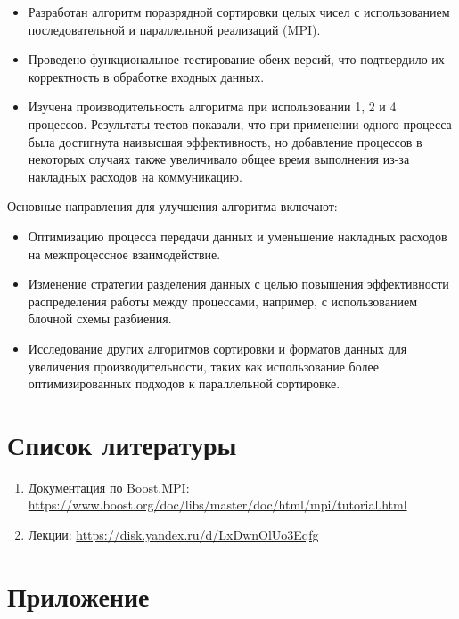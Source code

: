 \documentclass[12pt]{article}
\begin{document}
\begin{itemize}
    \item Разработан алгоритм поразрядной сортировки целых чисел с использованием последовательной и параллельной реализаций (MPI).
    
    \item Проведено функциональное тестирование обеих версий, что подтвердило их корректность в обработке входных данных.
    
    \item Изучена производительность алгоритма при использовании 1, 2 и 4 процессов. Результаты тестов показали, что при применении одного процесса была достигнута наивысшая эффективность, но добавление процессов в некоторых случаях также увеличивало общее время выполнения из-за накладных расходов на коммуникацию.
\end{itemize}

Основные направления для улучшения алгоритма включают:

\begin{itemize}
    \item Оптимизацию процесса передачи данных и уменьшение накладных расходов на межпроцессное взаимодействие.
    
    \item Изменение стратегии разделения данных с целью повышения эффективности распределения работы между процессами, например, с использованием блочной схемы разбиения.
    
    \item Исследование других алгоритмов сортировки и форматов данных для увеличения производительности, таких как использование более оптимизированных подходов к параллельной сортировке.
\end{itemize}


\section{Список литературы}
\begin{enumerate}
    \item Документация по Boost.MPI: \url{https://www.boost.org/doc/libs/master/doc/html/mpi/tutorial.html}
    \item Лекции: \url{https://disk.yandex.ru/d/LxDwnOlUo3Eqfg}
\end{enumerate}
\appendix
\section*{Приложение}
\end{document}
